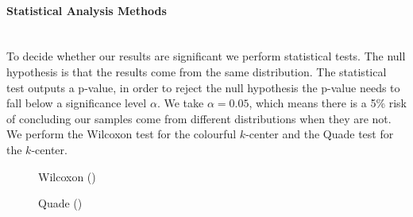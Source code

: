 \paragraph{Statistical Analysis Methods}~\\
To decide whether our results are significant we perform statistical tests. The null hypothesis is that the results come from the same distribution. The statistical test outputs a p-value, in order to reject the null hypothesis the p-value needs to fall below a significance level $\alpha$. We take $\alpha =0.05$, which means there is a 5\% risk of concluding our samples come from different distributions when they are not. We perform the Wilcoxon test for the colourful $k$-center and the Quade test for the $k$-center.

\setcounter{method_counter}{0}
\begin{figure}[H] 
    \addtocounter{figure}{-1}
    \renewcommand{\thefigure}{\arabic{method_counter}}
    \renewcommand\figurename{Method}
    \addtocounter{method_counter}{1}
    \caption{Wilcoxon (\cite{wilcoxon_individual_1945})}
    \label{method:wilcoxon_test}
    \vspace{0.1cm}
\end{figure}

\begin{figure}[H] 
    \addtocounter{figure}{-1}
    \renewcommand{\thefigure}{\arabic{method_counter}}
    \renewcommand\figurename{Method}
    \addtocounter{method_counter}{1}
    \caption{Quade (\cite{conover_analysis_1982})}
    \label{method:quade_test}
    \vspace{0.1cm}
\end{figure}

